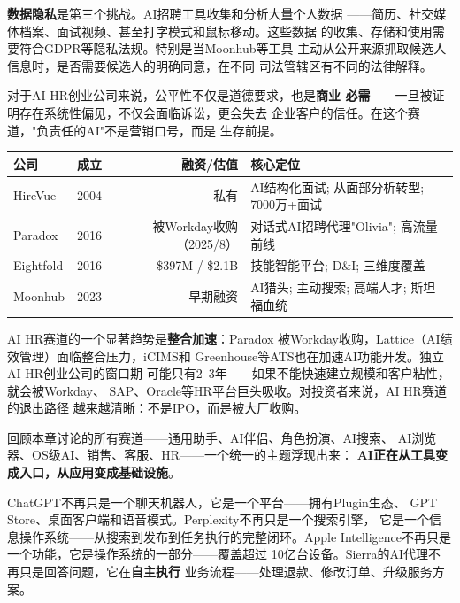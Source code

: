 \textbf{数据隐私}是第三个挑战。AI招聘工具收集和分析大量个人数据
——简历、社交媒体档案、面试视频、甚至打字模式和鼠标移动。这些数据
的收集、存储和使用需要符合GDPR等隐私法规。特别是当Moonhub等工具
主动从公开来源抓取候选人信息时，是否需要候选人的明确同意，在不同
司法管辖区有不同的法律解释。

对于AI HR创业公司来说，公平性不仅是道德要求，也是\textbf{商业
必需}——一旦被证明存在系统性偏见，不仅会面临诉讼，更会失去
企业客户的信任。在这个赛道，"负责任的AI"不是营销口号，而是
生存前提。

\begin{keybox}[AI HR 与招聘赛道全景]
\small
\begin{tabularx}{\textwidth}{l c r X}
\toprule
\rowcolor{figLightGray}
\textbf{公司} & \textbf{成立} & \textbf{融资/估值}
  & \textbf{核心定位} \\
\midrule
HireVue     & 2004 & 私有
  & AI结构化面试; 从面部分析转型; 7000万+面试 \\
Paradox     & 2016 & 被Workday收购（2025/8）
  & 对话式AI招聘代理"Olivia"; 高流量前线 \\
Eightfold   & 2016 & \$397M / \$2.1B
  & 技能智能平台; D\&I; 三维度覆盖 \\
Moonhub     & 2023 & 早期融资
  & AI猎头; 主动搜索; 高端人才; 斯坦福血统 \\
\bottomrule
\end{tabularx}

\medskip
\noindent AI HR赛道的一个显著趋势是\textbf{整合加速}：Paradox
被Workday收购，Lattice（AI绩效管理）面临整合压力，iCIMS和
Greenhouse等ATS也在加速AI功能开发。独立AI HR创业公司的窗口期
可能只有2--3年——如果不能快速建立规模和客户粘性，就会被Workday、
SAP、Oracle等HR平台巨头吸收。对投资者来说，AI HR赛道的退出路径
越来越清晰：不是IPO，而是被大厂收购。
\end{keybox}

\bigskip


回顾本章讨论的所有赛道——通用助手、AI伴侣、角色扮演、AI搜索、
AI浏览器、OS级AI、销售、客服、HR——一个统一的主题浮现出来：
\textbf{AI正在从工具变成入口，从应用变成基础设施}。

ChatGPT不再只是一个聊天机器人，它是一个平台——拥有Plugin生态、
GPT Store、桌面客户端和语音模式。Perplexity不再只是一个搜索引擎，
它是一个信息操作系统——从搜索到发布到任务执行的完整闭环。Apple
Intelligence不再只是一个功能，它是操作系统的一部分——覆盖超过
10亿台设备。Sierra的AI代理不再只是回答问题，它在\textbf{自主执行}
业务流程——处理退款、修改订单、升级服务方案。

